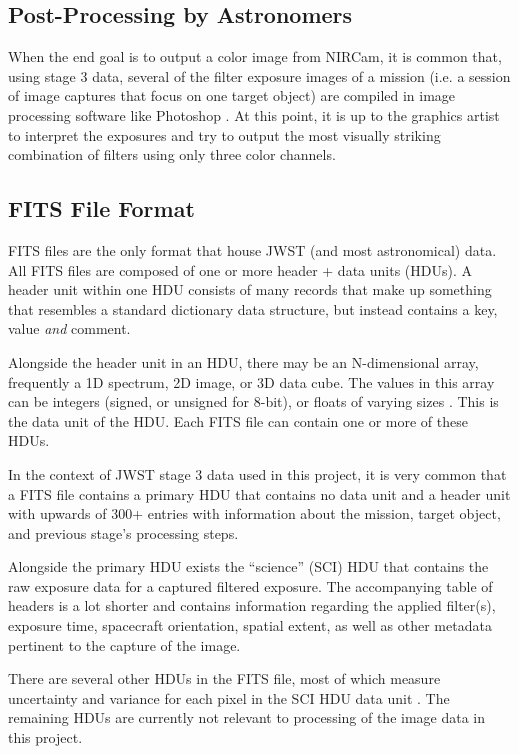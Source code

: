 \documentclass[10pt,twocolumn,letterpaper]{article}
\begin{document}
\subsection{Post-Processing by Astronomers}
When the end goal is to output a color image from NIRCam, it is common that, using stage 3 data, several of the filter exposure images of a mission (i.e. a session of image captures that focus on one target object) are compiled in image processing software like Photoshop \cite{editinterview}. At this point, it is up to the graphics artist to interpret the exposures and try to output the most visually striking combination of filters using only three color channels.

\subsection{FITS File Format}
FITS files are the only format that house JWST (and most astronomical) data. All FITS files are composed of one or more header + data units (HDUs).
A header unit within one HDU consists of many records that make up something that resembles a standard dictionary data structure, but instead contains a key, value \emph{and} comment.

Alongside the header unit in an HDU, there may be an N-dimensional array, frequently a 1D spectrum, 2D image, or 3D data cube. The values in this array can be integers (signed, or unsigned for 8-bit), or floats of varying sizes \cite{fitsdoc}. This is the data unit of the HDU. Each FITS file can contain one or more of these HDUs.

In the context of JWST stage 3 data used in this project, it is very common that a FITS file contains a primary HDU that contains no data unit and a header unit with upwards of 300+ entries with information about the mission, target object, and previous stage's processing steps.

Alongside the primary HDU exists the ``science'' (SCI) HDU that contains the raw exposure data for a captured filtered exposure. The accompanying table of headers is a lot shorter and contains information regarding the applied filter(s), exposure time, spacecraft orientation, spatial extent, as well as other metadata pertinent to the capture of the image.

There are several other HDUs in the FITS file, most of which measure uncertainty and variance for each pixel in the SCI HDU data unit \cite{webbfits}. The remaining HDUs are currently not relevant to processing of the image data in this project.
\end{document}
